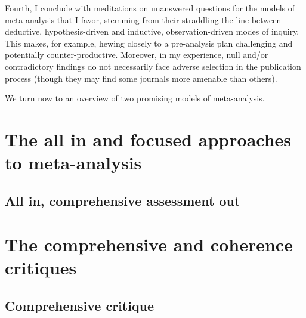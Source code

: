 \documentclass{article}
\begin{document}
Fourth, I conclude with meditations on unanswered questions for the
models of meta-analysis that I favor, stemming from their straddling the
line between deductive, hypothesis-driven and inductive,
observation-driven modes of inquiry. This makes, for example, hewing
closely to a pre-analysis plan challenging and potentially
counter-productive. Moreover, in my experience, null and/or
contradictory findings do not necessarily face adverse selection in the
publication process (though they may find some journals more amenable
than others).

We turn now to an overview of two promising models of meta-analysis.

\section{The all in and focused approaches to
meta-analysis}\label{the-all-in-and-focused-approaches-to-meta-analysis}

\subsection{All in, comprehensive assessment
out}\label{all-in-comprehensive-assessment-out}

\section{The comprehensive and coherence
critiques}\label{the-comprehensive-and-coherence-critiques}

\subsection{Comprehensive critique}\label{comprehensive-critique}
\end{document}
